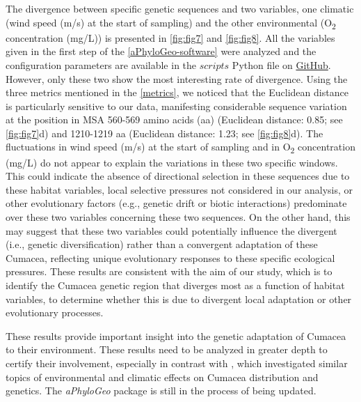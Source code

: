 The divergence between specific genetic sequences and two variables, one climatic (wind speed (m/s) at the start of sampling) and the other environmental (O\textsubscript{2} concentration (mg/L)) is presented in \autoref{fig:fig7} and \autoref{fig:fig8}. All the variables given in the first step of the \autoref{aPhyloGeo-software} were analyzed and the configuration parameters are available in the $scripts$ Python file on \href{https://github.com/tahiri-lab/Cumacea_aPhyloGeo}{GitHub}. However, only these two show the most interesting rate of divergence. Using the three metrics mentioned in the \autoref{metrics}, we noticed that the Euclidean distance is particularly sensitive to our data, manifesting considerable sequence variation at the position in MSA 560-569 amino acids (aa) (Euclidean distance: 0.85; see \autoref{fig:fig7}d) and 1210-1219 aa (Euclidean distance: 1.23; see \autoref{fig:fig8}d). The fluctuations in wind speed (m/s) at the start of sampling and in O\textsubscript{2} concentration (mg/L) do not appear to explain the variations in these two specific windows. This could indicate the absence of directional selection in these sequences due to these habitat variables, local selective pressures not considered in our analysis, or other evolutionary factors (e.g., genetic drift or biotic interactions) predominate over these two variables concerning these two sequences. On the other hand, this may suggest that these two variables could potentially influence the divergent (i.e., genetic diversification) rather than a convergent adaptation of these Cumacea, reflecting unique evolutionary responses to these specific ecological pressures. These results are consistent with the aim of our study, which is to identify the Cumacea genetic region that diverges most as a function of habitat variables, to determine whether this is due to divergent local adaptation or other evolutionary processes.

These results provide important insight into the genetic adaptation of Cumacea to their environment. These results need to be analyzed in greater depth to certify their involvement, especially in contrast with \citep{uhlir_adding_2021}, which investigated similar topics of environmental and climatic effects on Cumacea distribution and genetics. The \textit{aPhyloGeo} package is still in the process of being updated.

